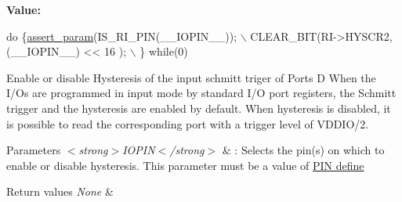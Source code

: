 {\bfseries Value\-:}
\begin{DoxyCode}
\textcolor{keywordflow}{do} \{\hyperlink{stm32l1xx__hal__conf_8h_a631dea7b230e600555f979c62af1de21}{assert\_param}(IS\_RI\_PIN(\_\_IOPIN\_\_)); \(\backslash\)
            CLEAR\_BIT(RI->HYSCR2, (\_\_IOPIN\_\_) << 16 ); \(\backslash\)
          \} \textcolor{keywordflow}{while}(0)
\end{DoxyCode}


Enable or disable Hysteresis of the input schmitt triger of Ports D When the I/\-Os are programmed in input mode by standard I/\-O port registers, the Schmitt trigger and the hysteresis are enabled by default. When hysteresis is disabled, it is possible to read the corresponding port with a trigger level of V\-D\-D\-I\-O/2. 


\begin{DoxyParams}{Parameters}
{\em $<$strong$>$\-I\-O\-P\-I\-N$<$/strong$>$} & \-: Selects the pin(s) on which to enable or disable hysteresis. This parameter must be a value of \hyperlink{group___r_i___pin}{P\-I\-N define} \\
\hline
\end{DoxyParams}

\begin{DoxyRetVals}{Return values}
{\em None} & \\
\hline
\end{DoxyRetVals}
